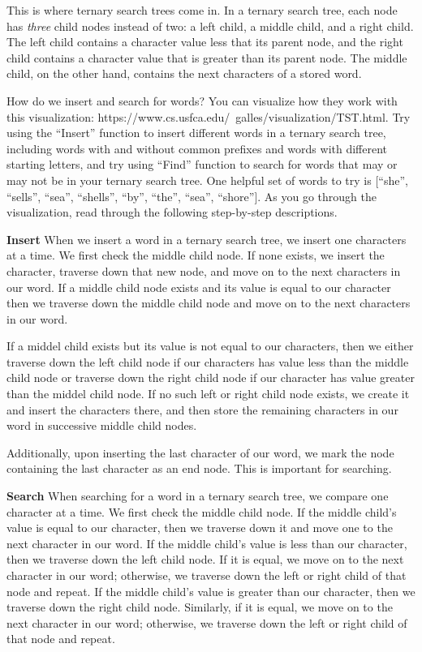 \documentclass[addpoints,12pt,answers]{exam}
\begin{document}
\begin{questions}
This is where ternary search trees come in. In a ternary search tree, each node has \textit{three} child nodes instead of two: a left child, 
a middle child, and a right child. The left child contains a character value less that its parent node, and the right child contains a character value
that is greater than its parent node. The middle child, on the other hand, contains the next characters of a stored word.

How do we insert and search for words? You can visualize how they work with this visualization: https://www.cs.usfca.edu/~galles/visualization/TST.html.
Try using the ``Insert'' function to insert different words in a ternary search tree, including words with and without common prefixes and words with different
starting letters, and try using ``Find'' function to search for words that may or may not be in your ternary search tree. One helpful set of words to try is
[``she'',  ``sells'', ``sea'', ``shells'', ``by'', ``the'', ``sea'', ``shore'']. As you go through the visualization, read through the following step-by-step
descriptions.

\textbf{Insert}
When we insert a word in a ternary search tree, we insert one characters at a time. We first check the middle child node. If none exists, we insert the 
character, traverse down that new node, and move on to the next characters in our word. If a middle child node exists and its value is equal to our character
then we traverse down the middle child node and move on to the next characters in our word.

If a middel child exists but its value is not equal to our characters, then we either traverse down the left child node if our characters has value less than 
the middle child node or traverse down the right child node if our character has value greater than the middel child node. If no such left or right child node exists,
we create it and insert the characters there, and then store the remaining characters in our word in successive middle child nodes.

Additionally, upon inserting the last character of our word, we mark the node containing the last character as an end node. This is important for searching.

\textbf{Search}
When searching for a word in a ternary search tree, we compare one character at a time. We first check the middle child node. If the middle child's value is equal to our character, 
then we traverse down it and move one to the next character in our word. If the middle child's value is less than our character, then we traverse down the left child node. 
If it is equal, we move on to the next character in our word; otherwise, we traverse down the left or right child of that node and repeat. If the middle child's value is greater than 
our character, then we traverse down the right child node. Similarly, if it is equal, we move on to the next character in our word; otherwise, we traverse down the left or right child 
of that node and repeat.


\end{questions}
\end{document}
